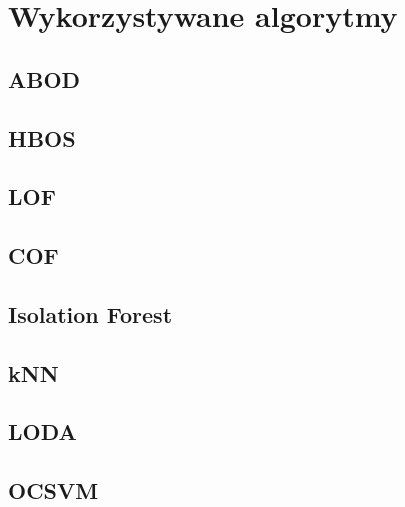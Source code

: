 
\section{Wykorzystywane algorytmy}
\subsection{ABOD}
\subsection{HBOS}
\subsection{LOF}
\subsection{COF}
\subsection{Isolation Forest}
\subsection{kNN}
\subsection{LODA}
\subsection{OCSVM}